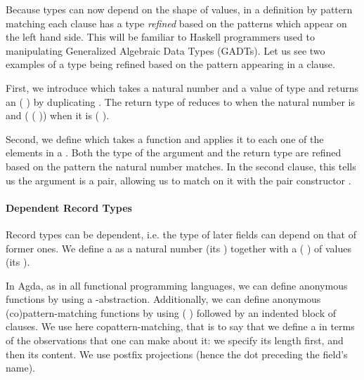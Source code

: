 
Because types can now depend on the shape of values, in a definition by pattern
matching each clause has a type \emph{refined} based on the patterns which appear
on the left hand side. This will be familiar to Haskell programmers used to
manipulating Generalized Algebraic Data Types (GADTs). Let us see two examples of
a type being refined based on the pattern appearing in a clause.

First, we introduce  which takes a natural number  and a value
 of type  and returns an ( ) by duplicating .
The return type of  reduces to  when the natural number is
 and (  (  )) when it is
( ).


Second, we define  which takes a function and
applies it to each one of the elements in a . Both the type of the
 argument and the  return type are refined based on the
pattern the natural number matches. In the second clause, this tells us the
 argument is a pair, allowing us to match on it with the pair
constructor \AIC{\_,\_}.


\paragraph{Dependent Record Types}

Record types can be dependent, i.e. the type of later fields can depend on that of
former ones. We define a  as a natural number (its ) together
with a ( ) of values (its ).


In Agda, as in all functional programming languages, we can define anonymous functions
by using a -abstraction. Additionally, we can define anonymous (co)pattern-matching
functions by using ( ) followed by an indented block of clauses.
We use here copattern-matching, that is to say that we define a  in terms
of the observations that one can make about it: we specify its length first, and
then its content. We use postfix projections (hence the dot preceding the field's name).

